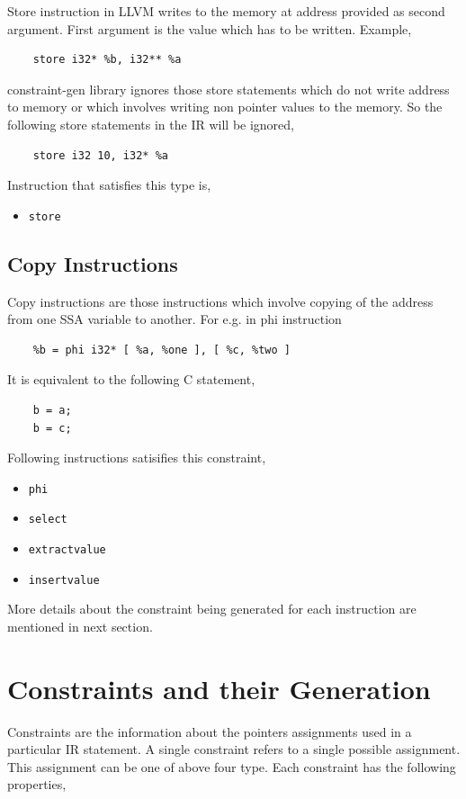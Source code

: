 \documentclass[a4paper,12pt]{report}
\begin{document}
\noindent
Store instruction in LLVM writes to the memory at address provided as second
argument. First argument is the value which has to be written.
Example,
\begin{verbatim}
    store i32* %b, i32** %a
\end{verbatim}

\noindent
constraint-gen library ignores those store statements which do not write address
to memory or which involves writing non pointer values to the memory. So the
following store statements in the IR will be ignored,

\begin{lstlisting}
    store i32 10, i32* %a
\end{lstlisting}

\noindent
Instruction that satisfies this type is,
\begin{itemize}
 \item \texttt{store}
\end{itemize}


\subsection{Copy Instructions}
Copy instructions are those instructions which involve copying of the address 
from one SSA variable to another. For e.g. in phi instruction
\begin{lstlisting}
    %b = phi i32* [ %a, %one ], [ %c, %two ]
\end{lstlisting}

\noindent
It is equivalent to the following C statement,
\begin{lstlisting}
    b = a;
    b = c;
\end{lstlisting}

\noindent
Following instructions satisifies this constraint,
\begin{itemize}
    \item \texttt{phi}
    \item \texttt{select}
    \item \texttt{extractvalue}
    \item \texttt{insertvalue}
\end{itemize}

More details about the constraint being generated for each instruction are
mentioned in next section.

\section{Constraints and their Generation}
Constraints are the information about the pointers assignments used in a 
particular IR statement. A single constraint refers to a single possible 
assignment. This assignment can be one of above four type. Each constraint has 
the following properties,
\end{document}
